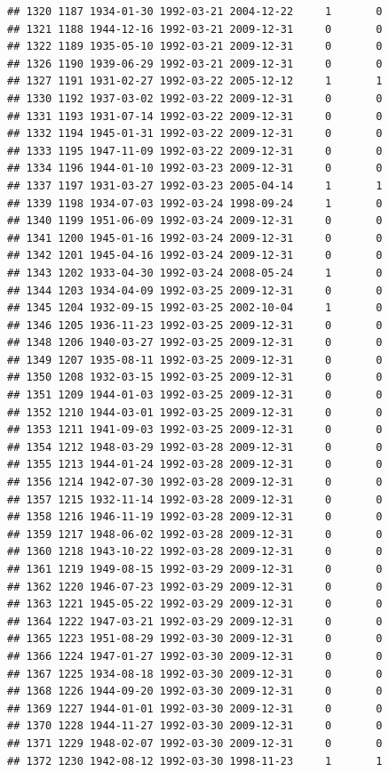 \documentclass[
]{book}
\begin{document}
\begin{verbatim}
## 1320 1187 1934-01-30 1992-03-21 2004-12-22     1       0
## 1321 1188 1944-12-16 1992-03-21 2009-12-31     0       0
## 1322 1189 1935-05-10 1992-03-21 2009-12-31     0       0
## 1326 1190 1939-06-29 1992-03-21 2009-12-31     0       0
## 1327 1191 1931-02-27 1992-03-22 2005-12-12     1       1
## 1330 1192 1937-03-02 1992-03-22 2009-12-31     0       0
## 1331 1193 1931-07-14 1992-03-22 2009-12-31     0       0
## 1332 1194 1945-01-31 1992-03-22 2009-12-31     0       0
## 1333 1195 1947-11-09 1992-03-22 2009-12-31     0       0
## 1334 1196 1944-01-10 1992-03-23 2009-12-31     0       0
## 1337 1197 1931-03-27 1992-03-23 2005-04-14     1       1
## 1339 1198 1934-07-03 1992-03-24 1998-09-24     1       0
## 1340 1199 1951-06-09 1992-03-24 2009-12-31     0       0
## 1341 1200 1945-01-16 1992-03-24 2009-12-31     0       0
## 1342 1201 1945-04-16 1992-03-24 2009-12-31     0       0
## 1343 1202 1933-04-30 1992-03-24 2008-05-24     1       0
## 1344 1203 1934-04-09 1992-03-25 2009-12-31     0       0
## 1345 1204 1932-09-15 1992-03-25 2002-10-04     1       0
## 1346 1205 1936-11-23 1992-03-25 2009-12-31     0       0
## 1348 1206 1940-03-27 1992-03-25 2009-12-31     0       0
## 1349 1207 1935-08-11 1992-03-25 2009-12-31     0       0
## 1350 1208 1932-03-15 1992-03-25 2009-12-31     0       0
## 1351 1209 1944-01-03 1992-03-25 2009-12-31     0       0
## 1352 1210 1944-03-01 1992-03-25 2009-12-31     0       0
## 1353 1211 1941-09-03 1992-03-25 2009-12-31     0       0
## 1354 1212 1948-03-29 1992-03-28 2009-12-31     0       0
## 1355 1213 1944-01-24 1992-03-28 2009-12-31     0       0
## 1356 1214 1942-07-30 1992-03-28 2009-12-31     0       0
## 1357 1215 1932-11-14 1992-03-28 2009-12-31     0       0
## 1358 1216 1946-11-19 1992-03-28 2009-12-31     0       0
## 1359 1217 1948-06-02 1992-03-28 2009-12-31     0       0
## 1360 1218 1943-10-22 1992-03-28 2009-12-31     0       0
## 1361 1219 1949-08-15 1992-03-29 2009-12-31     0       0
## 1362 1220 1946-07-23 1992-03-29 2009-12-31     0       0
## 1363 1221 1945-05-22 1992-03-29 2009-12-31     0       0
## 1364 1222 1947-03-21 1992-03-29 2009-12-31     0       0
## 1365 1223 1951-08-29 1992-03-30 2009-12-31     0       0
## 1366 1224 1947-01-27 1992-03-30 2009-12-31     0       0
## 1367 1225 1934-08-18 1992-03-30 2009-12-31     0       0
## 1368 1226 1944-09-20 1992-03-30 2009-12-31     0       0
## 1369 1227 1944-01-01 1992-03-30 2009-12-31     0       0
## 1370 1228 1944-11-27 1992-03-30 2009-12-31     0       0
## 1371 1229 1948-02-07 1992-03-30 2009-12-31     0       0
## 1372 1230 1942-08-12 1992-03-30 1998-11-23     1       1

\end{verbatim}
\end{document}

